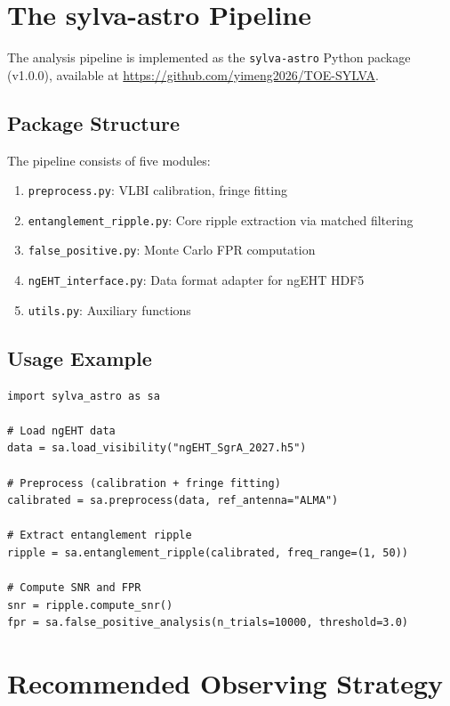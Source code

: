\documentclass[mnras]{mnras}
\begin{document}
\section{The sylva-astro Pipeline}
\label{sec:pipeline}

The analysis pipeline is implemented as the \texttt{sylva-astro} Python package (v1.0.0), available at \url{https://github.com/yimeng2026/TOE-SYLVA}.

\subsection{Package Structure}

The pipeline consists of five modules:
\begin{enumerate}
\item \texttt{preprocess.py}: VLBI calibration, fringe fitting
\item \texttt{entanglement\_ripple.py}: Core ripple extraction via matched filtering
\item \texttt{false\_positive.py}: Monte Carlo FPR computation
\item \texttt{ngEHT\_interface.py}: Data format adapter for ngEHT HDF5
\item \texttt{utils.py}: Auxiliary functions
\end{enumerate}

\subsection{Usage Example}

\begin{verbatim}
import sylva_astro as sa

# Load ngEHT data
data = sa.load_visibility("ngEHT_SgrA_2027.h5")

# Preprocess (calibration + fringe fitting)
calibrated = sa.preprocess(data, ref_antenna="ALMA")

# Extract entanglement ripple
ripple = sa.entanglement_ripple(calibrated, freq_range=(1, 50))

# Compute SNR and FPR
snr = ripple.compute_snr()
fpr = sa.false_positive_analysis(n_trials=10000, threshold=3.0)
\end{verbatim}

\section{Recommended Observing Strategy}
\label{sec:observing}
\end{document}
